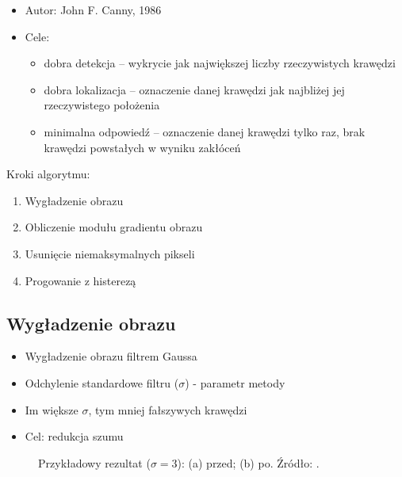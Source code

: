 \documentclass[a4paper,twocolumn,12pt]{article}
\begin{document}
\begin{itemize}
 \item Autor: John F. Canny, 1986
 \item Cele:
  \begin{itemize}
   \item dobra detekcja – wykrycie jak największej liczby rzeczywistych krawędzi
   \item dobra lokalizacja – oznaczenie danej krawędzi jak najbliżej jej rzeczywistego położenia
   \item minimalna odpowiedź – oznaczenie danej krawędzi tylko raz, brak krawędzi powstałych w wyniku zakłóceń
  \end{itemize}
\end{itemize}

Kroki algorytmu:
\begin{enumerate}
 \item Wygładzenie obrazu
 \item Obliczenie modułu gradientu obrazu
 \item Usunięcie niemaksymalnych pikseli
 \item Progowanie z histerezą
\end{enumerate}


\subsection{Wygładzenie obrazu}

\begin{itemize}
 \item Wygładzenie obrazu filtrem Gaussa
 \item Odchylenie standardowe filtru ($\sigma$) - parametr metody
 \item Im większe $\sigma$, tym mniej fałszywych krawędzi
 \item Cel: redukcja szumu
\end{itemize}

\begin{figure}[!ht]
 \begin{center}
 \end{center}
 \caption{
  Przykładowy rezultat ($\sigma = 3$):
  (a) przed;
  (b) po.
  Źródło: \cite{boldak}.
 }
 \label{fig:canny_smoothing}
\end{figure}
\end{document}
